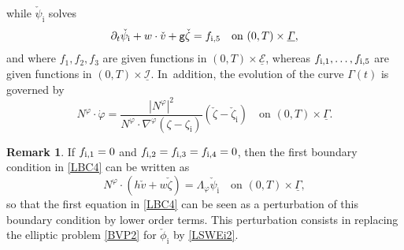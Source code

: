 \documentclass[JEP,XML,SOM,Unicode,NoFloatCountersInSection,published]{cedram}
\newcommand{\gr}{{\mathtt g}}
\newcommand{\dt}{\partial_t}
\newcommand{\cI}{{\mathcal I}}
\newcommand{\cE}{{\mathcal E}}
\newcommand{\ul}[1]{\underline{#1}}
\newcommand{\itGamma}{\mathit{\Gamma}}
\theoremstyle{definition}
\newtheorem{remark}[theorem]{Remark}
\begin{document}
while $\check{\psi}_\mathrm{i}$ solves
\begin{equation}\label{LBC4bis}
\dt\check{\psi}_\mathrm{i}+w\cdot\check{v}+\gr\check{\zeta}=f_{{\rm i},5} \quad \text{on } (0,T)\times\ul{\itGamma},
\end{equation}
and where $f_1,f_2,f_3$ are given functions in $(0,T)\times\ul{\cE}$, whereas $f_{{\rm i},1},\ldots,f_{{\rm i},5}$ are given functions in $(0,T)\times\ul{\cI}$. In~addition, the evolution of the curve $\itGamma(t)$ is governed by
\begin{equation}\label{EqPhibis}
N^\varphi\cdot\dot{\varphi} = \frac{|N^\varphi|^2}{N^\varphi\cdot\nabla^\varphi(\zeta-\zeta_\mathrm{i})}(\check{\zeta} -\check{\zeta}_\mathrm{i})
\quad\text{on } (0,T)\times\ul{\itGamma}.
\end{equation}

\begin{remark}
If $f_{{\rm i},1}=0$ and $f_{{\rm i},2}=f_{{\rm i},3}=f_{{\rm i},4}=0$, then the first boundary condition in \eqref{LBC4} can be written as
\[
N^\varphi\cdot(h\check{v}+w\check{\zeta}) = \Lambda_\varphi \check{\psi}_\mathrm{i}\quad \text{on } (0,T)\times \ul{\itGamma},
\]
so that the first equation in \eqref{LBC4} can be seen as a perturbation of this boundary condition by lower order terms.
This perturbation consists in replacing the elliptic problem \eqref{BVP2} for $\check{\phi}_\mathrm{i}$ by \eqref{LSWEi2}.
\end{remark}
\end{document}

